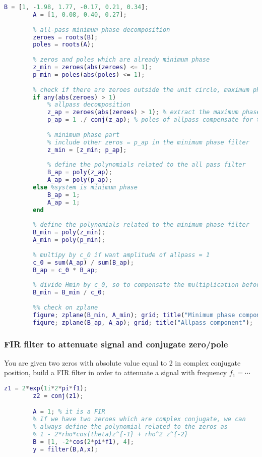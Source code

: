     \begin{lstlisting}[language=Matlab, escapeinside=`']
        B = [1, -1.98, 1.77, -0.17, 0.21, 0.34];
        A = [1, 0.08, 0.40, 0.27];
        
        % all-pass minimum phase decomposition
        zeroes = roots(B);
        poles = roots(A);
        
        % zeros and poles which are already minimum phase
        z_min = zeroes(abs(zeroes) <= 1);
        p_min = poles(abs(poles) <= 1);
        
        % check if there are zeroes outside the unit circle, maximum phase
        if any(abs(zeroes) > 1)
            % allpass decomposition
            z_ap = zeroes(abs(zeroes) > 1); % extract the maximum phase zeroes
            p_ap = 1 ./ conj(z_ap); % poles of allpass compensate for the zeros
        
            % minimum phase part
            % include other zeros = p_ap in the minimum phase filter
            z_min = [z_min; p_ap];
        
            % define the polynomials related to the all pass filter
            B_ap = poly(z_ap);
            A_ap = poly(p_ap);
        else %system is minimum phase
            B_ap = 1;
            A_ap = 1;
        end
        
        % define the polynomials related to the minimum phase filter
        B_min = poly(z_min);
        A_min = poly(p_min);
        
        % multipy by c_0 if want amplitude of allpass = 1
        c_0 = sum(A_ap) / sum(B_ap);
        B_ap = c_0 * B_ap;
        
        % divide Hmin by c_0, so to compensate the multiplication before
        B_min = B_min / c_0;
        
        %% check on zplane
        figure; zplane(B_min, A_min); grid; title("Minimum phase component");        
        figure; zplane(B_ap, A_ap); grid; title("Allpass component");
    \end{lstlisting}

    \subsubsection{FIR filter to attenuate signal and conjugate zero/pole}
    You are given two zeros with absolute value equal to 2 in complex conjugate position, build a FIR filter in order to attenuate a signal with frequency $f_1=\cdots$
    \begin{lstlisting}[language=Matlab, escapeinside=`']
        z1 = 2*exp(1i*2*pi*f1);
        z2 = conj(z1);

        A = 1; % it is a FIR
        % If we have two zeroes which are complex conjugate, we can
        % always define the polynomial related to the zeros as
        % 1 - 2*rho*cos(theta)z^{-1} + rho^2 z^{-2}
        B = [1, -2*cos(2*pi*f1), 4];
        y = filter(B,A,x);
    \end{lstlisting}

